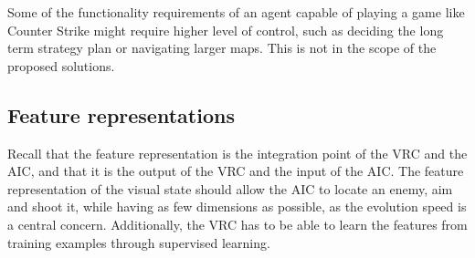 Some of the functionality requirements of an agent capable of playing a game like Counter Strike might require higher level of control, such as deciding the long term strategy plan or navigating larger maps. This is not in the scope of the proposed solutions.

\subsection{Feature representations}
Recall that the feature representation is the integration point of the VRC and the AIC, and that it is the output of the VRC and the input of the AIC.
The feature representation of the visual state should allow the AIC to locate an enemy, aim and shoot it, while having as few dimensions as possible, as the evolution speed is a central concern. Additionally, the VRC has to be able to learn the features from training examples through supervised learning.

